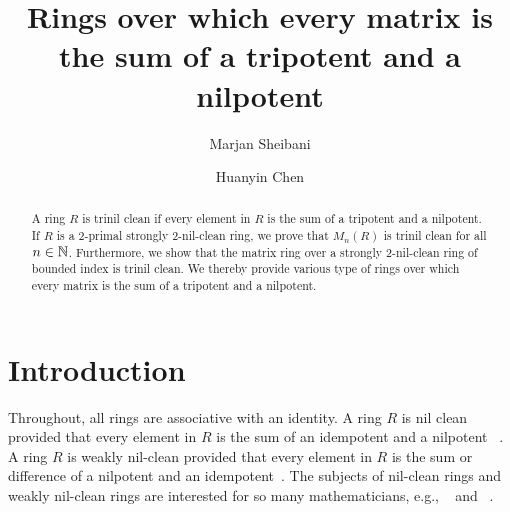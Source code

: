 \documentclass[12pt, reqno]{amsart}
\numberwithin{equation}{section}
\begin{document}
\title[the sum of a tripotent and a nilpotent]{Rings over which every matrix is the sum of a tripotent and a nilpotent}

\author{Marjan Sheibani}
\author{Huanyin Chen}
\address{
Faculty of Mathematics\\Statistics and Computer Science\\  Semnan University\\ Semnan, Iran}
\address{
Department of Mathematics\\ Hangzhou Normal University\\ Hang -zhou, China}

 

\begin{abstract}
A ring $R$ is  trinil clean if every element in $R$ is the sum of a tripotent and a nilpotent.
If $R$ is a 2-primal strongly 2-nil-clean ring, we prove that $M_n(R)$ is trinil clean for all $n\in {\Bbb N}$.
Furthermore, we show that the matrix ring over a strongly 2-nil-clean ring of bounded index is trinil clean. We thereby provide various type of rings over which every matrix is the sum of a tripotent and a nilpotent.\end{abstract}

\maketitle

\section{Introduction}

Throughout, all rings are associative with an identity. A ring $R$ is nil clean provided that every element in $R$ is the sum of an idempotent and a nilpotent ~\cite{D}. A ring $R$ is weakly nil-clean provided that every element in $R$ is the sum or difference of a nilpotent and an idempotent~\cite{BD}.
The subjects of nil-clean rings and weakly nil-clean rings are interested for so many mathematicians, e.g., ~\cite{BD,B,CH,DW,D,K,KWZ,KZ} and ~\cite{ST}.
\end{document}
